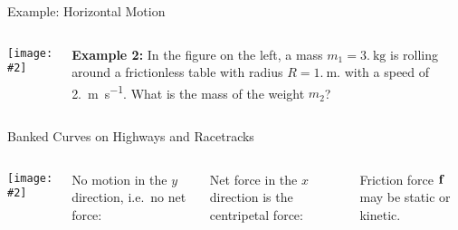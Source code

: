\documentclass[12pt,compress,aspectratio=169]{beamer}
\newcommand{\pic}[2]{\texttt{[image: \#2]}}
\newcommand{\mb}[1]{\ensuremath\mathbf{#1}}
\newcommand{\eq}[2]{\vspace{#1}{\Large\begin{displaymath}#2\end{displaymath}}}
\begin{document}
\begin{frame}{Example: Horizontal Motion}
  \begin{columns}
    \pic{1}{puck-on-table.png}
    
    \textbf{Example 2:} In the figure on the left, a mass
    $m_1=\SI{3.}{\kilo\gram}$ is rolling around a frictionless table with
    radius $R=\SI{1.}{\metre}$. with a speed of \SI{2.}{\metre\per\second}.
    What is the mass of the weight $m_2$?
  \end{columns}
\end{frame}



\begin{frame}{Banked Curves on Highways and Racetracks}
  \begin{columns}
    \centering
    \pic{.8}{banked-turn-acceleration.png}\\

    No motion in the $y$ direction, i.e.\ no net force:

    \eq{-.35in}{
      \sum F_y=N\cos\theta-f\sin\theta-w=0
    }

    Net force in the $x$ direction is the centripetal force:

    \eq{-.35in}{
      \sum F_x=N\sin\theta +f\cos\theta = \frac{mv^2}{r}
    }

    Friction force $\mb{f}$ may be static or kinetic.
  \end{columns}
\end{frame}
\end{document}
